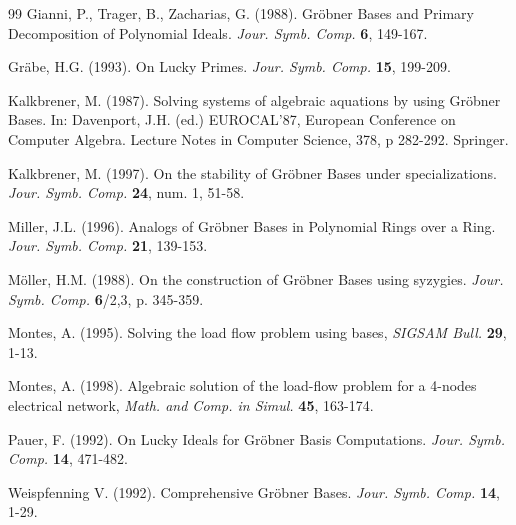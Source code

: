 \begin{thebibliography}{99}
     Gianni, P., Trager, B., Zacharias, G. (1988). Gr\"obner Bases and Primary
     Decomposition of Polynomial Ideals.
     {\em Jour. Symb. Comp.} {\bf 6}, 149-167.

     Gr\"abe, H.G. (1993). On Lucky Primes.
     {\em Jour. Symb. Comp.} {\bf 15}, 199-209.

     Kalkbrener, M. (1987). Solving systems of algebraic aquations by
     using Gr\"obner Bases. In: Davenport, J.H. (ed.) EUROCAL'87,
     European Conference on Computer Algebra. Lecture Notes in
     Computer Science, 378, p 282-292. Springer.

     Kalkbrener, M. (1997). On the stability of Gr\"obner Bases
     under specializations.
     {\em Jour. Symb. Comp.} {\bf 24}, num. 1, 51-58.

     Miller, J.L. (1996). Analogs of Gr\"obner Bases in Polynomial
     Rings over a Ring.
     {\em Jour. Symb. Comp.} {\bf 21}, 139-153.

     M\"oller, H.M. (1988). On the construction of Gr\"obner Bases
     using syzygies.
     {\em Jour. Symb. Comp.} {\bf 6}/2,3, p. 345-359.

     Montes, A. (1995). Solving the load flow problem using
     \Gr bases, {\em SIGSAM Bull.\/} {\bf 29}, 1-13.

     Montes, A. (1998). Algebraic solution of the load-flow
     problem for a 4-nodes electrical network, {\em Math.\/ and
     Comp.\/ in Simul.\/} {\bf 45}, 163-174.

     Pauer, F. (1992). On Lucky Ideals for Gr\"obner Basis Computations.
     {\em Jour. Symb. Comp.} {\bf 14}, 471-482.

     Weispfenning V. (1992). Comprehensive Gr\"obner Bases.
     {\em Jour. Symb. Comp.} {\bf 14}, 1-29.

\end{thebibliography}




